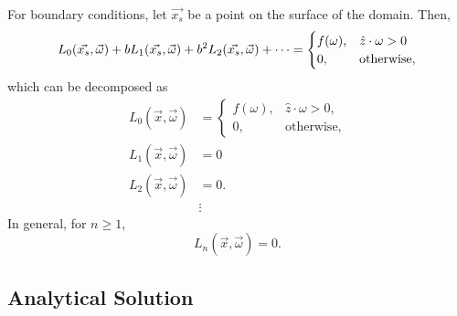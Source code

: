 For boundary conditions, let $\vec{x_s}$ be a point on the surface of the domain.
Then, 
\begin{equation*}
  L_0(\vec{x_s},\vec{\omega}) + b L_1(\vec{x_s},\vec{\omega}) + b^2 L_2(\vec{x_s},\vec{\omega}) + \cdots =
  \begin{cases}
    f(\omega), & \hat{z}\cdot\omega > 0 \\
    0, & \mbox{otherwise},
  \end{cases}
\end{equation*}
which can be decomposed as
\begin{align}
  L_0(\vec{x}, \vec{\omega}) &=
  \begin{cases}
    f(\omega), & \hat{z}\cdot\omega > 0, \\
    0, & \mbox{otherwise},
  \end{cases}
  \label{eqn:asymptotics_bc_0} \\
  L_1(\vec{x}, \vec{\omega}) &= 0 \nonumber \\
  L_2(\vec{x}, \vec{\omega}) &= 0. \nonumber \\
  &\vdots \nonumber
\end{align}
In general, for $n \geq 1$,
\begin{equation}
  L_n(\vec{x}, \vec{\omega}) = 0.
  \label{eqn:asymptotics_bc_n}
\end{equation}

 
\subsection{Analytical Solution}
\label{sec:asymptotic_sol}

